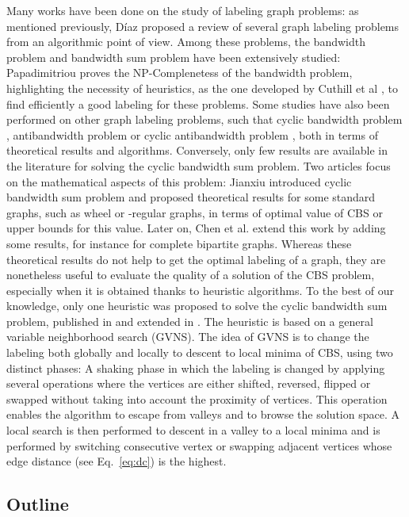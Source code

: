 \documentclass{scrartcl}
\theoremstyle{plain}
\newcommand{\gvns}{GVNS}
\newcommand{\cbs}{CBS}
\begin{document}
Many works have been done on the study of labeling graph problems: as mentioned 
previously, D\'iaz \cite{Diaz2002} proposed a review of several graph labeling 
problems from an algorithmic point of view. Among these problems, the bandwidth 
problem and bandwidth sum problem have been extensively studied: Papadimitriou 
\cite{Papadimitriou1976} proves the NP-Complenetess of the bandwidth problem, 
highlighting the necessity of heuristics, as the one developed by Cuthill et al 
\cite{Cuthill1969}, to find efficiently a good labeling for these problems. Some 
studies have also been performed on other graph labeling problems, such that 
cyclic bandwidth problem \cite{Lin1994, Romero-Monsivais2013}, antibandwidth 
problem \cite{Calamoneri2006} or cyclic antibandwidth problem \cite{Lozano2013}, 
both in terms of theoretical results and algorithms. Conversely, only few 
results are available in the literature for solving the cyclic bandwidth sum 
problem. Two articles focus on the mathematical aspects of this problem: Jianxiu 
\cite{Jianxiu2001} introduced cyclic bandwidth sum problem and proposed 
theoretical results for some standard graphs, such as wheel or -regular 
graphs, in terms of optimal value of \cbs{} or upper bounds for this value. 
Later on, Chen et al. \cite{Chen2007} extend this work by adding some results, 
for instance for complete bipartite graphs. Whereas these theoretical results do 
not help to get the optimal labeling of a graph, they are nonetheless useful to 
evaluate the quality of a solution of the \cbs{} problem, especially when it is 
obtained thanks to heuristic algorithms.  To the best of our knowledge, only one 
heuristic was proposed to solve the cyclic bandwidth sum problem, published in 
\cite{Satsangi2012} and extended in \cite{Satsangi2013}. The heuristic is based 
on a general variable neighborhood search (\gvns{}). The idea of \gvns{} is to 
change the labeling both globally and locally to descent to local minima of 
\cbs{}, using two distinct phases: A shaking phase in which the labeling is 
changed by applying several operations where the vertices are either shifted, 
reversed, flipped or swapped without taking into account the proximity of 
vertices. This operation enables the algorithm to escape from valleys and to 
browse the solution space. A local search is then performed to descent in a 
valley to a local minima and is performed by switching consecutive vertex or 
swapping adjacent vertices whose edge distance (see Eq.~\ref{eq:dc}) is the 
highest.

\subsection{Outline}
\end{document}
